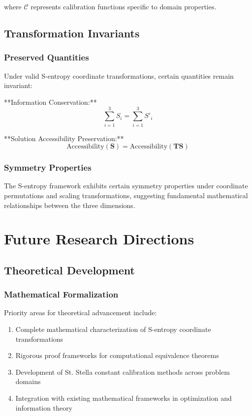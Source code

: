 \documentclass[11pt]{article}
\begin{document}
where $\mathcal{C}$ represents calibration functions specific to domain properties.

\subsection{Transformation Invariants}

\subsubsection{Preserved Quantities}

Under valid S-entropy coordinate transformations, certain quantities remain invariant:

**Information Conservation:**
\begin{equation}
\sum_{i=1}^{3} S_i = \sum_{i=1}^{3} S'_i
\label{eq:information_conservation}
\end{equation}

**Solution Accessibility Preservation:**
\begin{equation}
\text{Accessibility}(\mathbf{S}) = \text{Accessibility}(\mathbf{T}\mathbf{S})
\label{eq:accessibility_preservation}
\end{equation}

\subsubsection{Symmetry Properties}

The S-entropy framework exhibits certain symmetry properties under coordinate permutations and scaling transformations, suggesting fundamental mathematical relationships between the three dimensions.

\section{Future Research Directions}

\subsection{Theoretical Development}

\subsubsection{Mathematical Formalization}

Priority areas for theoretical advancement include:

\begin{enumerate}
\item Complete mathematical characterization of S-entropy coordinate transformations
\item Rigorous proof frameworks for computational equivalence theorems
\item Development of St. Stella constant calibration methods across problem domains
\item Integration with existing mathematical frameworks in optimization and information theory
\end{enumerate}
\end{document}
